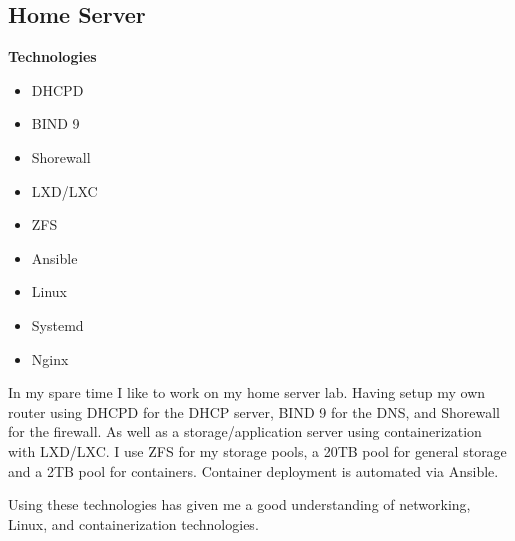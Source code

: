 \documentclass[a4paper]{cv}
\begin{document}
\begin{minipage}[t]{0.66\textwidth}
\subsection{Home Server}
\begin{multicols}{4}
{\bfseries Technologies}\vfill\null
\columnbreak
\begin{itemize} 
    \item DHCPD
    \item BIND 9
    \item Shorewall
    \item LXD/LXC
    \item ZFS
    \item Ansible
    \item Linux
    \item Systemd
    \item Nginx
\end{itemize}
\end{multicols}
In my spare time I like to work on my home server lab. Having setup my own router using DHCPD for the DHCP server, BIND 9 for the DNS, and Shorewall for the firewall. As well as a storage/application server using containerization with LXD/LXC. I use ZFS for my storage pools, a 20TB pool for general storage and a 2TB pool for containers. Container deployment is automated via Ansible.

Using these technologies has given me a good understanding of networking, Linux, and containerization technologies.
\end{minipage}
\end{document}
